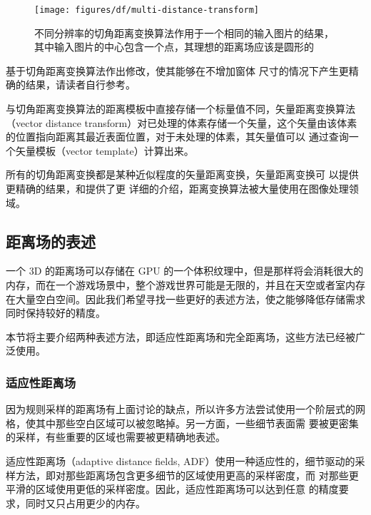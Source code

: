 \begin{figure}
\begin{fullwidth}
	\texttt{[image: figures/df/multi-distance-transform]}
	\caption{不同分辨率的切角距离变换算法作用于一个相同的输入图片的结果，其中输入图片的中心包含一个点，其理想的距离场应该是圆形的}
	\label{f:df-multi-distance-transform}
\end{fullwidth}
\end{figure}

\cite{a:dead-reckoning}基于切角距离变换算法作出修改，使其能够在不增加窗体 尺寸的情况下产生更精确的结果，请读者自行参考。

与切角距离变换算法的距离模板中直接存储一个标量值不同，矢量距离变换算法（vector distance transform）对已处理的体素存储一个矢量，这个矢量由该体素的位置指向距离其最近表面位置，对于未处理的体素，其矢量值可以 通过查询一个矢量模板（vector template）计算出来。

所有的切角距离变换都是某种近似程度的矢量距离变换，矢量距离变换可 以提供更精确的结果，\cite{a:Euclidean-Distance-Mapping}和\cite{a:Vector-City-VDT}提供了更 详细的介绍，距离变换算法被大量使用在图像处理领域。



\subsection{距离场的表述}
一个 3D 的距离场可以存储在 GPU 的一个体积纹理中，但是那样将会消耗很大的内存，而在一个游戏场景中，整个游戏世界可能是无限的，并且在天空或者室内存在大量空白空间。因此我们希望寻找一些更好的表述方法，使之能够降低存储需求同时保持较好的精度。

本节将主要介绍两种表述方法，即适应性距离场和完全距离场，这些方法已经被广泛使用。



\subsubsection{适应性距离场}
因为规则采样的距离场有上面讨论的缺点，所以许多方法尝试使用一个阶层式的网格，使其中那些空白区域可以被忽略掉。另一方面，一些细节表面需 要被更密集的采样，有些重要的区域也需要被更精确地表述。

适应性距离场（adaptive distance fields, ADF）使用一种适应性的，细节驱动的采样方法，即对那些距离场包含更多细节的区域使用更高的采样密度，而 对那些更平滑的区域使用更低的采样密度。因此，适应性距离场可以达到任意 的精度要求，同时又只占用更少的内存。

